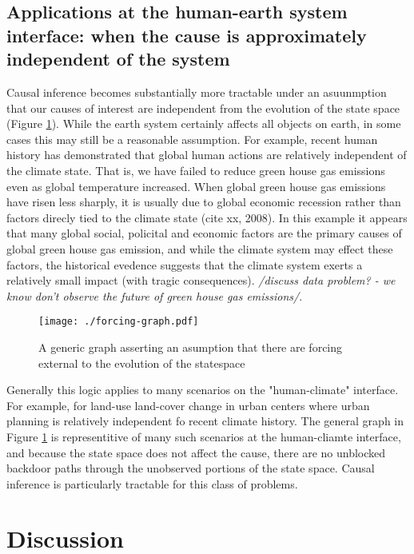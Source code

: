 \documentclass[12pt]{article}
\begin{document}
\subsection{Applications at the human-earth system interface: when the
  cause is approximately independent of the system}
\label{human}

Causal inference becomes substantially more tractable under an
asuunmption that our causes of interest are independent from the
evolution of the state space (Figure \ref{fig:forcing}). While the
earth system certainly affects all objects on earth, in some cases
this may still be a reasonable assumption. For example, recent human
history has demonstrated that global human actions are relatively
independent of the climate state. That is, we have failed to reduce
green house gas emissions even as global temperature increased. When
global green house gas emissions have risen less sharply, it is
usually due to global economic recession rather than factors direcly
tied to the climate state (cite xx, 2008). In this example it appears
that many global social, policital and economic factors are the primary
causes of global green house gas emission, and while the climate
system may effect these factors, the historical evedence suggests that
the climate system exerts a relatively small impact (with tragic
consequences). \emph{/discuss data problem? - we know don't observe the future
  of green house gas emissions/}.

\begin{figure}
  \texttt{[image: ./forcing-graph.pdf]}
  \caption{A generic graph asserting an asumption that there are
    forcing external to the evolution of the statespace}
  \label{fig:forcing}
\end{figure}

Generally this logic applies to many scenarios on the "human-climate"
interface. For example, for land-use land-cover change in urban
centers where urban planning is relatively independent fo recent
climate history. The general graph in Figure \ref{fig:forcing} is
representitive of many such scenarios at the human-cliamte interface,
and because the state space does not affect the cause, there are no
unblocked backdoor paths through the unobserved portions of the state
space. Causal inference is particularly tractable for this class of
problems.

\section{Discussion}
\end{document}
